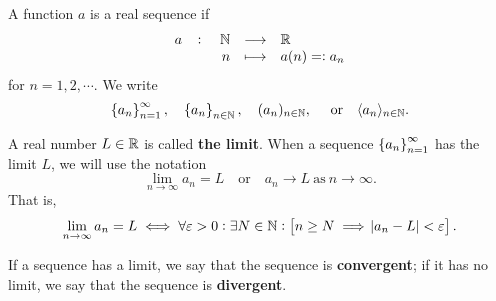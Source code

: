 \documentclass[11pt,openany]{article}
\begin{document}
\vfill
{}
\begin{remark*}
A function $a$ is a real sequence if \[
\fullfunction{a}{\N}{\R}{n}{a(n)=:a_n}
\] for $n=1,2,\cdots$. We write \[
\set{a_n}_{n=1}^\infty,\quad \set{a_n}_{n\in\mathbb{N}},\quad (a_n)_{n\in\mathbb{N}},\quad\ \text{or}\quad \langle a_n \rangle_{n\in\mathbb{N}}.
\]
\end{remark*}
\begin{remark*}
	A real number $L\in\mathbb{R}$ is called \textbf{the limit}. When a sequence $\set{a_n}_{n=1}^\infty$ has the limit $L$, we will use the notation \[
	\lim_{n\to\infty}a_n=L\quad\text{or}\quad a_n\to L\ \text{as}\ n\to\infty.
	\]  That is, \[
		\lim_{n\to\infty}a_n=L\iff \forall\varepsilon>0:\exists N\in\mathbb{N}:\left[ n\geq N\implies \abs{a_n-L}<\varepsilon\right].
	\]
\end{remark*}

\newpage
\begin{note}
	If a sequence has a limit, we say that the sequence is \textbf{convergent}; if it has no limit, we say that the sequence is \textbf{divergent}.
\end{note}
\end{document}

